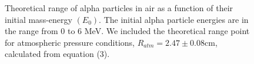 \documentclass[a4paper]{article}
\begin{document}
\clearpage



\begin{figure}
\caption{Theoretical range of alpha particles in air as a function of their initial mass-energy $(E_0)$. The initial alpha particle energies are in the range from 0 to 6 MeV. We included the theoretical range point for atmospheric pressure conditions, $R_{atm} = 2.47 \pm 0.08$cm, calculated from equation (3).
}
\end{figure}
\end{document}
